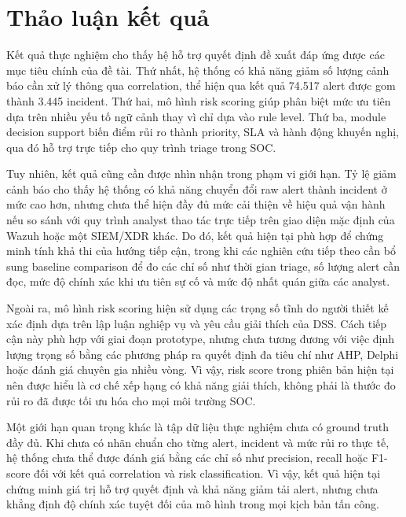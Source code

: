 \documentclass[a4paper,12pt,oneside]{book}
\begin{document}
\section{Thảo luận kết quả}
{\fontsize{13pt}{15.6pt}\selectfont

Kết quả thực nghiệm cho thấy hệ hỗ trợ quyết định đề xuất đáp ứng được các mục tiêu chính của đề tài. Thứ nhất, hệ thống có khả năng giảm số lượng cảnh báo cần xử lý thông qua correlation, thể hiện qua kết quả 74.517 alert được gom thành 3.445 incident. Thứ hai, mô hình risk scoring giúp phân biệt mức ưu tiên dựa trên nhiều yếu tố ngữ cảnh thay vì chỉ dựa vào rule level. Thứ ba, module decision support biến điểm rủi ro thành priority, SLA và hành động khuyến nghị, qua đó hỗ trợ trực tiếp cho quy trình triage trong SOC.

\noindent Tuy nhiên, kết quả cũng cần được nhìn nhận trong phạm vi giới hạn. Tỷ lệ giảm cảnh báo cho thấy hệ thống có khả năng chuyển đổi raw alert thành incident ở mức cao hơn, nhưng chưa thể hiện đầy đủ mức cải thiện về hiệu quả vận hành nếu so sánh với quy trình analyst thao tác trực tiếp trên giao diện mặc định của Wazuh hoặc một SIEM/XDR khác. Do đó, kết quả hiện tại phù hợp để chứng minh tính khả thi của hướng tiếp cận, trong khi các nghiên cứu tiếp theo cần bổ sung baseline comparison để đo các chỉ số như thời gian triage, số lượng alert cần đọc, mức độ chính xác khi ưu tiên sự cố và mức độ nhất quán giữa các analyst.

\noindent Ngoài ra, mô hình risk scoring hiện sử dụng các trọng số tĩnh do người thiết kế xác định dựa trên lập luận nghiệp vụ và yêu cầu giải thích của DSS. Cách tiếp cận này phù hợp với giai đoạn prototype, nhưng chưa tương đương với việc định lượng trọng số bằng các phương pháp ra quyết định đa tiêu chí như AHP, Delphi hoặc đánh giá chuyên gia nhiều vòng. Vì vậy, risk score trong phiên bản hiện tại nên được hiểu là cơ chế xếp hạng có khả năng giải thích, không phải là thước đo rủi ro đã được tối ưu hóa cho mọi môi trường SOC.

\noindent Một giới hạn quan trọng khác là tập dữ liệu thực nghiệm chưa có ground truth đầy đủ. Khi chưa có nhãn chuẩn cho từng alert, incident và mức rủi ro thực tế, hệ thống chưa thể được đánh giá bằng các chỉ số như precision, recall hoặc F1-score đối với kết quả correlation và risk classification. Vì vậy, kết quả hiện tại chứng minh giá trị hỗ trợ quyết định và khả năng giảm tải alert, nhưng chưa khẳng định độ chính xác tuyệt đối của mô hình trong mọi kịch bản tấn công.


}
\end{document}
